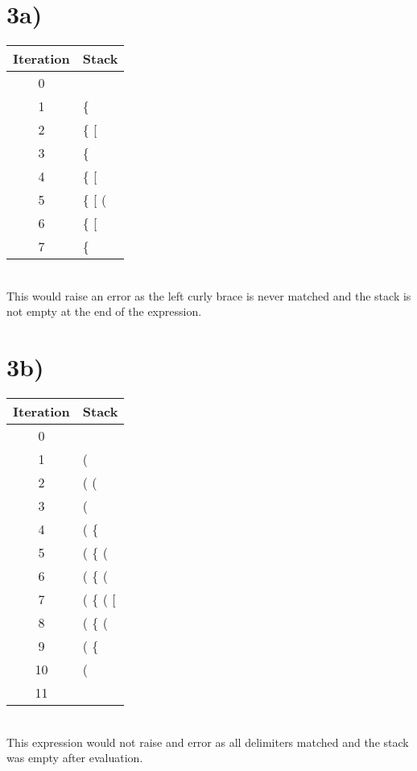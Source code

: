 \documentclass[a4paper,11pt]{article}
\begin{document}

\section*{3a)} 
\begin{tabular}{ c || l }
  \hline			
  Iteration & Stack \\
  \hline
  0 &    \\
  1 & \{      \\
  2 & \{ [    \\
  3 & \{    \\
  4 & \{ [    \\
  5 & \{ [ (   \\
  6 & \{ [    \\
  7 & \{    \\
  \hline  
\end{tabular} \\

This would raise an error as the left curly brace is never matched and the stack is not empty at the end of the expression.


\section*{3b)} 
\begin{tabular}{ c || l }
  \hline			
  Iteration & Stack \\
  \hline
  0 &   \\
  1 & (           \\
  2 & ( (         \\
  3 & (           \\
  4 & ( \{        \\
  5 & ( \{ (      \\
  6 & ( \{ (      \\
  7 & ( \{ ( [    \\
  8 & ( \{ (      \\
  9 & ( \{        \\
  10 & (         \\
  11 &           \\
  \hline  
\end{tabular} \\

This expression would not raise and error as all delimiters matched and the stack was empty after evaluation.
\end{document}

